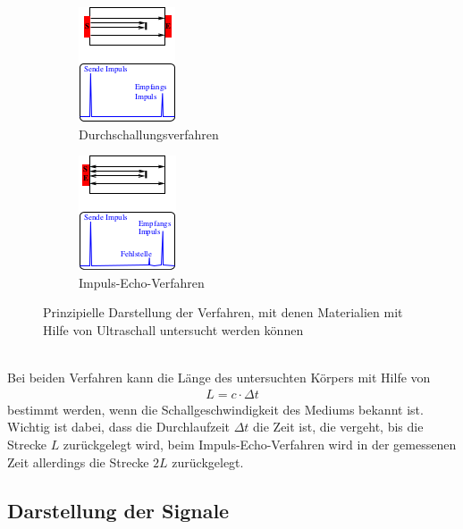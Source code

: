\begin{figure}[h!]
	\centering
	\begin{subfigure}{.5\textwidth}
		\centering
		\includegraphics[width=.4\textwidth]{Durchschallung.png}
		\caption{Durchschallungsverfahren}
		\label{fig:Durchschall}
	\end{subfigure}%
	\begin{subfigure}{.5\textwidth}
		\centering
		\includegraphics[width=.4\textwidth]{ImpulsEcho.png}
		\caption{Impuls-Echo-Verfahren}
		\label{fig:ImpulsEcho}
	\end{subfigure}
	\caption{Prinzipielle Darstellung der Verfahren, mit denen Materialien mit Hilfe von Ultraschall untersucht werden können}
	\label{fig:test}
\end{figure} \\
Bei beiden Verfahren kann die Länge des untersuchten Körpers mit Hilfe von
\begin{align}
	L = c \cdot \Delta t
\end{align}
bestimmt werden, wenn die Schallgeschwindigkeit des Mediums bekannt ist. Wichtig ist dabei, dass die Durchlaufzeit $\Delta t$ die Zeit ist, die vergeht, bis die Strecke $L$ zurückgelegt wird, beim Impuls-Echo-Verfahren wird in der gemessenen Zeit allerdings die Strecke $2L$ zurückgelegt.

\subsection{Darstellung der Signale}
